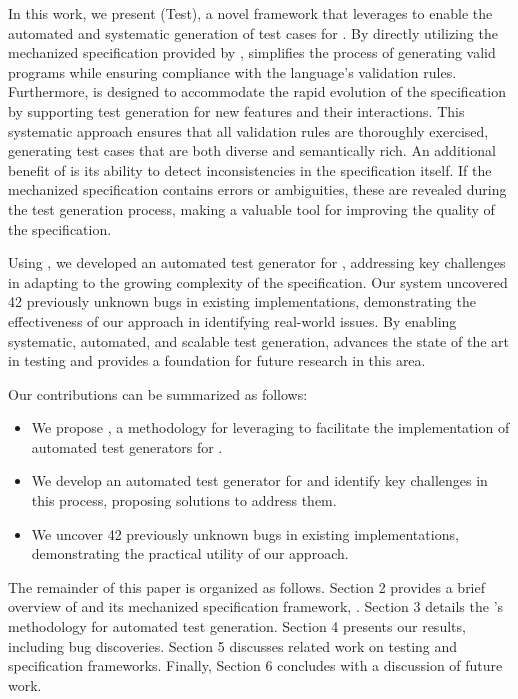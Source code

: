 In this work, we present \west (\wasm Test), a novel framework that leverages
\spectec to enable the automated and systematic generation of test cases for \wasm.
By directly utilizing the mechanized specification provided by \spectec,
\west simplifies the process of generating valid \wasm programs while ensuring
compliance with the language's validation rules.
Furthermore, \west is designed to accommodate the rapid evolution of the \wasm specification by supporting test
generation for new features and their interactions.
This systematic approach ensures that all validation rules are thoroughly exercised, generating test
cases that are both diverse and semantically rich.
An additional benefit of \west is its ability to detect inconsistencies in the specification itself.
If the mechanized specification contains errors or ambiguities, these are revealed
during the test generation process, making \west a valuable tool for improving
the quality of the \wasm specification.

Using \west, we developed an automated test generator for , addressing
key challenges in adapting to the growing complexity of the specification.
Our system uncovered 42 previously unknown bugs in existing \wasm implementations,
demonstrating the effectiveness of our approach in identifying real-world issues.
By enabling systematic, automated, and scalable test generation, \west
advances the state of the art in \wasm testing and provides a foundation for
future research in this area.

Our contributions can be summarized as follows: 
\begin{itemize}
\item
We propose \west, a methodology for leveraging \spectec to facilitate
the implementation of automated test generators for \wasm.
\item
We develop an automated test generator for  and
identify key challenges in this process, proposing solutions to address them.
\item
We uncover 42 previously unknown bugs in existing \wasm implementations,
demonstrating the practical utility of our approach.
\end{itemize}

The remainder of this paper is organized as follows.
Section 2 provides a brief overview of \wasm and its mechanized specification framework, \spectec.
Section 3 details the \west's methodology for automated test generation.
Section 4 presents our results, including bug discoveries.
Section 5 discusses related work on \wasm testing and specification frameworks.
Finally, Section 6 concludes with a discussion of future work.
